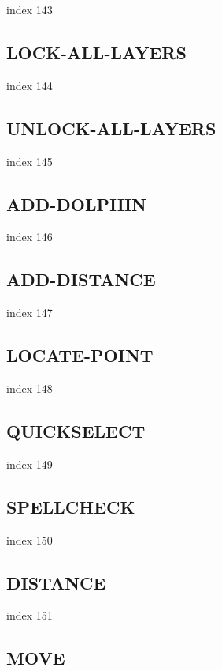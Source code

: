 \documentclass[a4paper]{report}
\begin{document}
{{{{{{{{{{{{{index 143

\subsection{LOCK-ALL-LAYERS}

index 144

\subsection{UNLOCK-ALL-LAYERS}

index 145

\subsection{ADD-DOLPHIN}

index 146

\subsection{ADD-DISTANCE}

index 147

\subsection{LOCATE-POINT}

index 148

\subsection{QUICKSELECT}

index 149

\subsection{SPELLCHECK}

index 150

\subsection{DISTANCE}

index 151

\subsection{MOVE}

}}}}}}}}}}}}}
\end{document}
